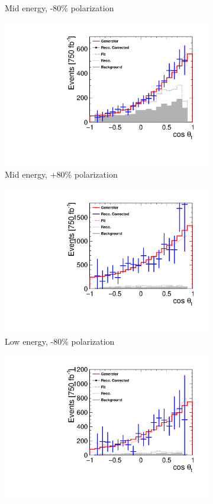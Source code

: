 \begin{figure}[]
\begin{subfigure}[]{0.5\linewidth}
    \caption{Mid energy, -80\% polarization} 
    \vspace{4ex}
  \end{subfigure}%
  \begin{subfigure}[]{0.5\linewidth}
    \centering
    \includegraphics[width=0.75\linewidth]{TopAnalysis/figures/ThetaPlots_900GeVPos.pdf} 
    \caption{Mid energy, +80\% polarization} 
    \vspace{4ex}
  \end{subfigure}
  \begin{subfigure}[]{0.5\linewidth}
    \centering
    \includegraphics[width=0.75\linewidth]{TopAnalysis/figures/ThetaPlots_400GeVNeg.pdf} 
    \caption{Low energy, -80\% polarization} 
    \vspace{4ex}
  \end{subfigure}%
  \begin{subfigure}[]{0.5\linewidth}
    \centering
    \includegraphics[width=0.75\linewidth]{TopAnalysis/figures/ThetaPlots_400GeVPos.pdf} 

\end{subfigure}
\end{figure}
